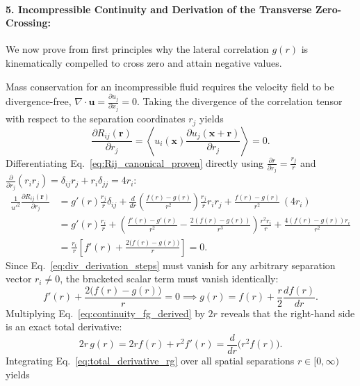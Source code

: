 \documentclass[lineno]{jfm}
\begin{document}
\paragraph{5. Incompressible Continuity and Derivation of the Transverse Zero-Crossing:}
We now prove from first principles why the lateral correlation $g(r)$ is kinematically compelled to cross zero and attain negative values.

Mass conservation for an incompressible fluid requires the velocity field to be divergence-free, $\nabla \cdot \mathbf{u} = \frac{\partial u_j}{\partial x_j} = 0$. Taking the divergence of the correlation tensor with respect to the separation coordinates $r_j$ yields
\begin{equation}
\frac{\partial R_{ij}(\mathbf{r})}{\partial r_j} = \left\langle u_i(\mathbf{x}) \frac{\partial u_j(\mathbf{x}+\mathbf{r})}{\partial r_j} \right\rangle = 0.
\label{eq:div_Rij_zero}
\end{equation}
Differentiating Eq.~\eqref{eq:Rij_canonical_proven} directly using $\frac{\partial r}{\partial r_j} = \frac{r_j}{r}$ and $\frac{\partial}{\partial r_j}(r_i r_j) = \delta_{ij}r_j + r_i\delta_{jj} = 4r_i$:
\begin{align}
\frac{1}{u'^2}\frac{\partial R_{ij}(\mathbf{r})}{\partial r_j} &= g'(r)\frac{r_j}{r}\delta_{ij} + \frac{d}{dr}\left(\frac{f(r)-g(r)}{r^2}\right)\frac{r_j}{r} r_i r_j + \frac{f(r)-g(r)}{r^2}\,(4r_i) \nonumber\\
&= g'(r)\frac{r_i}{r} + \left(\frac{f'(r)-g'(r)}{r^2} - \frac{2(f(r)-g(r))}{r^3}\right)\frac{r^2 r_i}{r} + \frac{4(f(r)-g(r)) r_i}{r^2} \nonumber\\
&= \frac{r_i}{r} \left[ f'(r) + \frac{2\big(f(r)-g(r)\big)}{r} \right] = 0.
\label{eq:div_derivation_steps}
\end{align}
Since Eq.~\eqref{eq:div_derivation_steps} must vanish for any arbitrary separation vector $r_i \neq 0$, the bracketed scalar term must vanish identically:
\begin{equation}
f'(r) + \frac{2\big(f(r)-g(r)\big)}{r} = 0 \implies g(r) = f(r) + \frac{r}{2}\frac{df(r)}{dr}.
\label{eq:continuity_fg_derived}
\end{equation}
Multiplying Eq.~\eqref{eq:continuity_fg_derived} by $2r$ reveals that the right-hand side is an exact total derivative:
\begin{equation}
2r\,g(r) = 2r f(r) + r^2 f'(r) = \frac{d}{dr}\big(r^2 f(r)\big).
\label{eq:total_derivative_rg}
\end{equation}
Integrating Eq.~\eqref{eq:total_derivative_rg} over all spatial separations $r \in [0, \infty)$ yields
\end{document}
